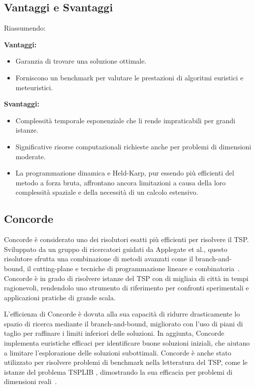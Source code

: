 \subsection{Vantaggi e Svantaggi}

Riassumendo:

\textbf{Vantaggi:}
\begin{itemize}
	\item Garanzia di trovare una soluzione ottimale.
	\item Forniscono un benchmark per valutare le prestazioni di algoritmi euristici e meteuristici.
\end{itemize}

\textbf{Svantaggi:}
\begin{itemize}
	\item Complessità temporale esponenziale che li rende impraticabili per grandi istanze.
	\item Significative risorse computazionali richieste anche per problemi di dimensioni moderate.
	\item La programmazione dinamica e Held-Karp, pur essendo più efficienti del metodo a forza bruta, affrontano ancora limitazioni a causa della loro complessità spaziale e della necessità di un calcolo estensivo.
\end{itemize}


\subsection{Concorde}


Concorde è considerato uno dei risolutori esatti più efficienti per risolvere il \Gls{TSP}. Sviluppato da un gruppo di ricercatori guidati da Applegate et al., questo risolutore sfrutta una combinazione di metodi avanzati come il branch-and-bound, il cutting-plane e tecniche di programmazione lineare e combinatoria~\cite{Applegate2007}. Concorde è in grado di risolvere istanze del \Gls{TSP} con di migliaia di città in tempi ragionevoli, rendendolo uno strumento di riferimento per confronti sperimentali e applicazioni pratiche di grande scala.

L'efficienza di Concorde è dovuta alla sua capacità di ridurre drasticamente lo spazio di ricerca mediante il branch-and-bound, migliorato con l'uso di piani di taglio per raffinare i limiti inferiori delle soluzioni. In aggiunta, Concorde implementa euristiche efficaci per identificare buone soluzioni iniziali, che aiutano a limitare l'esplorazione delle soluzioni subottimali. Concorde è anche stato utilizzato per risolvere problemi di benchmark nella letteratura del \Gls{TSP}, come le istanze del problema TSPLIB \cite{TSPLIB}, dimostrando la sua efficacia per problemi di dimensioni reali~\cite{Cook2011}.

